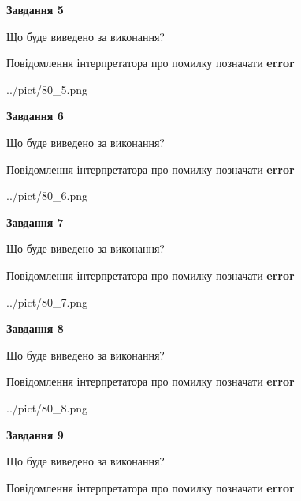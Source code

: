 \documentclass[11pt, ukrainian]{article}
\begin{document}
{\begin {large}
{\begin {center}\textbf{Завдання 5}\end {center}}\par
Що буде виведено за виконання? \par
Повідомлення інтерпретатора про помилку позначати \textbf{error}

\begin{center}
	{../pict/80_5.png}
\end{center}
\newpage

{\begin {center}\textbf{Завдання 6}\end {center}}\par
Що буде виведено за виконання? \par
Повідомлення інтерпретатора про помилку позначати \textbf{error}

\begin{center}
	{../pict/80_6.png}
\end{center}
\newpage

{\begin {center}\textbf{Завдання 7}\end {center}}\par
Що буде виведено за виконання? \par
Повідомлення інтерпретатора про помилку позначати \textbf{error}

\begin{center}
	{../pict/80_7.png}
\end{center}
\newpage

{\begin {center}\textbf{Завдання 8}\end {center}}\par
Що буде виведено за виконання? \par
Повідомлення інтерпретатора про помилку позначати \textbf{error}

\begin{center}
	{../pict/80_8.png}
\end{center}
\newpage

{\begin {center}\textbf{Завдання 9}\end {center}}\par
Що буде виведено за виконання? \par
Повідомлення інтерпретатора про помилку позначати \textbf{error}


\end{large}}
\end{document}
